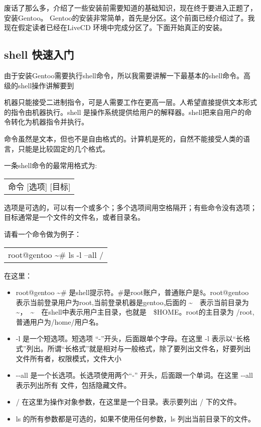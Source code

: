 \documentclass[amstex,twoside]{ctexbook}
\newenvironment{code}{\small\tt\begin{longtable}{p{0.8\textwidth}}}{\end{longtable}}
\begin{document}
废话了那么多，介绍了一些安装前需要知道的基础知识，现在终于要进入正题了，安装Gentoo。
Gentoo的安装非常简单，首先是分区。这个前面已经介绍过了。我现在假定读者已经在LiveCD 环境中完成分区了。下面开始真正的安装。


\subsection{shell 快速入门}

由于安装Gentoo需要执行shell命令，所以我需要讲解一下最基本的shell命令。高级的shell操作讲解要到

机器只能接受二进制指令，可是人需要工作在更高一层。人希望直接提供文本形式的指令由机器执行。shell 是操作系统提供给用户的解释器。shell把来自用户的命令转化为机器指令并执行。

命令虽然是文本，但也不是自由格式的。计算机是死的，自然不能接受人类的语言，只能是比较固定的几个格式。

一条shell命令的最常用格式为:

\begin{code}
命令 [选项] [目标]
\end{code}

选项是可选的，可以有一个或多个；多个选项间用空格隔开；有些命令没有选项；目标通常是一个文件的文件名，或者目录名。

请看一个命令做为例子： 

\begin{code}
root@gentoo \textasciitilde \# ls -l --all /  
\end{code}
在这里：

\begin{itemize}
\item root@gentoo \textasciitilde \# 是shell提示符。\#是root账户，普通账户是\$。root@gentoo 表示当前登录用户为root,当前登录机器是gentoo,后面的 \textasciitilde{}　表示当前目录为　\textasciitilde{}，　\textasciitilde{}　在shell中表示用户主目录，也就是　\$HOME。root的主目录为 /root,　普通用户为/home/用户名。
\item -l 是一个短选项。短选项 “-”开头，后面跟单个字母。在这里 -l 表示以“长格式”列出。所谓“长格式”就是相对与一般格式，除了要列出文件名，好要列出文件所有者，权限模式，文件大小
\item -{}-all 是一个长选项。长选项使用两个“-” 开头，后面跟一个单词。在这里 -{}-all 表示列出所有 文件，包括隐藏文件。
\item / 在这里为操作对象参数，在这里是一个目录。表示要列出 / 下的文件。
\item ls 的所有参数都是可选的，如果不使用任何参数，ls 列出当前目录下的文件。

\end{itemize}
\end{document}
